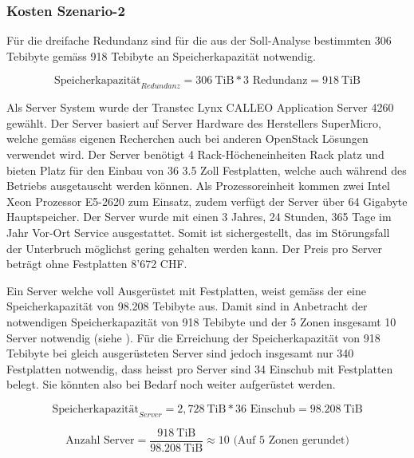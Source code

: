 \subsubsection{Kosten Szenario-2}

Für die dreifache Redundanz sind für die aus der Soll-Analyse bestimmten 306 Tebibyte gemäss  918 Tebibyte an Speicherkapazität notwendig.

\begin{equation}
\mbox{Speicherkapazität}_{Redundanz} = 306 \mathrm{\ TiB} * 3 \mbox{\ Redundanz} = 918 \mathrm{\ TiB}
\label{eqn:SpeicherkapazitätS2}
\end{equation}


Als Server System wurde der Transtec Lynx CALLEO Application Server 4260 gewählt. Der Server basiert auf Server Hardware des Herstellers SuperMicro, welche gemäss eigenen Recherchen auch bei anderen OpenStack Lösungen verwendet wird. Der Server benötigt 4 Rack-Höcheneinheiten Rack platz und bieten Platz für den Einbau von 36 3.5 Zoll Festplatten, welche auch während des Betriebs ausgetauscht werden können. Als Prozessoreinheit kommen zwei Intel Xeon Prozessor E5-2620 zum Einsatz, zudem verfügt der Server über 64 Gigabyte Hauptspeicher. Der Server wurde mit einen 3 Jahres, 24 Stunden, 365 Tage im Jahr Vor-Ort Service ausgestattet. Somit ist sichergestellt, das im Störungsfall der Unterbruch möglichst gering gehalten werden kann. Der Preis pro Server beträgt ohne Festplatten 8'672 CHF.


Ein Server welche voll Ausgerüstet mit Festplatten, weist gemäss der  eine Speicherkapazität von 98.208 Tebibyte aus. Damit sind in Anbetracht der notwendigen Speicherkapazität von 918 Tebibyte und der 5 Zonen insgesamt 10 Server notwendig (siehe ). Für die Erreichung der Speicherkapazität von 918 Tebibyte bei gleich ausgerüsteten Server sind jedoch insgesamt nur 340 Festplatten notwendig, dass heisst pro Server sind 34 Einschub mit Festplatten belegt. Sie könnten also bei Bedarf noch weiter aufgerüstet werden.

\begin{equation}
\mbox{Speicherkapazität}_{Server} = 2,728 \mathrm{\ TiB} * 36 \mbox{\ Einschub} = 98.208 \mathrm{\ TiB}
\label{eqn:SpeicherkapazitätServerS2}
\end{equation}

\begin{equation}
\mbox{Anzahl Server} = \frac{918 \mathrm{\ TiB}}{98.208 \mathrm{\ TiB}} \approx 10 \mbox{\ (Auf 5 Zonen gerundet)}
\label{eqn:AnzahlServerS2}
\end{equation}

